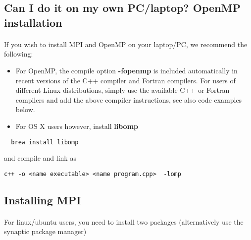\subsection*{Can I do it on my own PC/laptop? OpenMP installation}

\paragraph{}
If you wish to install MPI and OpenMP 
on your laptop/PC, we recommend the following:

\begin{itemize}
\item For OpenMP, the compile option \textbf{-fopenmp} is included automatically in recent versions of the C++ compiler and Fortran compilers. For users of different Linux distributions, simply use the available C++ or Fortran compilers and add the above compiler instructions, see also code examples below.

\item For OS X users however, install \textbf{libomp}
\end{itemize}

\noindent


\begin{verbatim}
  brew install libomp

\end{verbatim}

and compile and link as


\begin{verbatim}
c++ -o <name executable> <name program.cpp>  -lomp

\end{verbatim}



\subsection*{Installing MPI}

\paragraph{}
For linux/ubuntu users, you need to install two packages (alternatively use the synaptic package manager)



